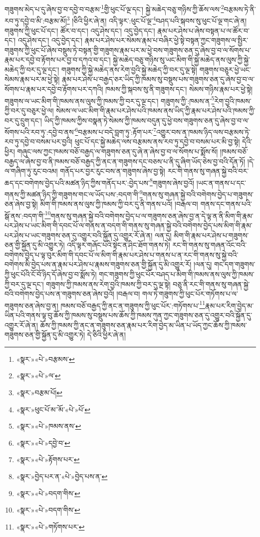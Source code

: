 གཟུགས་མེད་པ་དུ་ཞེས་བྱ་བ་དབྱེ་བ་བརྩམ་\footnote{«སྣར་»«པེ་»བརྩམས་}གྱི་ཕུང་པོ་ལྔ་དང་། སྐྱེ་མཆེད་བཅུ་གཉིས་ཀྱི་ཆོས་ལས་\footnote{«སྣར་»«པེ་»ལ་}བརྩམས་ཏེ་ནི་རབ་ཏུ་དབྱེ་བ་མི་:བརྩམ་མོ།\footnote{«སྣར་»བརྩམ་པོ།} །ཅིའི་ཕྱིར་ཞེ་ན། འདི་ལྟར་:ཕུང་པོ་ལྔ་\footnote{«སྣར་»ཕུང་པོ་མ་ོ་མ་«པེ་»པོ་}བཤད་པའི་སྐབས་སུ་ཕུང་པོ་ལྔ་གང་ཞེ་ན། གཟུགས་ཀྱི་ཕུང་པོ་དང་། ཚོར་བ་དང་། འདུ་ཤེས་དང་། འདུ་བྱེད་དང་། རྣམ་པར་ཤེས་པ་ཞེས་བསྟན་པ་ལ་ཚོར་བ་དང་། འདུ་ཤེས་དང་། འདུ་བྱེད་དང་། རྣམ་པར་ཤེས་པར་སེམས་རྣམ་པ་བཞིར་ཕྱེ་སྟེ་བསྟན་ཀྱང་གཟུགས་ལ་སྤྱིར་གཟུགས་ཀྱི་ཕུང་པོ་ཞེས་བསྡུས་ཏེ་བསྟན་གྱི་གཟུགས་རྣམ་པར་མ་ཕྱེ་བས་གཟུགས་ཅན་དུ་ཞེས་བྱ་བ་ལ་སོགས་པ་རྣམ་པར་དབྱེ་བ་རྟོགས་པར་བྱ་བ་དཀའ་བ་དང་། སྐྱེ་མཆེད་བཅུ་གཉིས་སུ་ཡང་མིག་གི་སྐྱེ་མཆེད་ནས་ལུས་ཀྱི་སྐྱེ་མཆེད་ཀྱི་བར་དུ་ལྔ་དང་། གཟུགས་ཀྱི་སྐྱེ་མཆེད་ནས་རེག་བྱའི་སྐྱེ་མཆེད་ཀྱི་བར་དུ་ལྔ་སྟེ། གཟུགས་བཅུར་ཕྱེ་ཡང་སེམས་རྣམ་པར་མ་ཕྱེ་སྟེ། རྣམ་པར་ཤེས་པ་བརྒྱད་ཅར་ཡིད་ཀྱི་ཁམས་སུ་བསྡུས་པས་གཟུགས་ཅན་དུ་ཞེས་བྱ་བ་ལ་སོགས་པ་རྣམ་པར་དབྱེ་བ་རྟོགས་པར་དཀའི། ཁམས་ཀྱི་སྐབས་སུ་ནི་གཟུགས་དང་། སེམས་གཉིས་རྣམ་པར་ཕྱེ་སྟེ། གཟུགས་ལ་ཡང་མིག་གི་ཁམས་ནས་ལུས་ཀྱི་ཁམས་ཀྱི་བར་དུ་ལྔ་དང་། གཟུགས་ཀྱི་:ཁམས་ན་\footnote{«སྣར་»«པེ་»ཁམས་ནས་}རེག་བྱའི་ཁམས་ཀྱི་བར་དུ་བཅུར་ཕྱེ་ལ། སེམས་ལ་ཡང་མིག་གི་རྣམ་པར་ཤེས་པའི་ཁམས་ནས་ཡིད་ཀྱི་རྣམ་པར་ཤེས་པའི་ཁམས་ཀྱི་བར་དུ་དྲུག་དང་། ཡིད་ཀྱི་ཁམས་ཀྱིས་བསྣན་ཏེ་སེམས་ཀྱི་ཁམས་བདུན་དུ་ཕྱེ་བས་གཟུགས་ཅན་དུ་ཞེས་བྱ་བ་ལ་སོགས་པའི་རབ་ཏུ་:དབྱེ་བ་ནས་\footnote{«སྣར་»«པེ་»དབྱེ་བ་}བརྩམས་པ་བདེ་བླག་ཏུ་:རྟོག་པར་\footnote{«སྣར་»«པེ་»རྟོགས་པར་}འགྱུར་བས་ན་ཁམས་ཉིད་ལས་བརྩམས་ཏེ་རབ་ཏུ་དབྱེ་བ་བསམ་པར་བྱའི། ཕུང་པོ་དང་སྐྱེ་མཆེད་ལས་བརྩམས་ནས་རབ་ཏུ་དབྱེ་བ་བསམ་པར་མི་བྱ་སྟེ། དེའི་ཕྱིར། གཞུང་ལས་ཀྱང་ཁམས་བཅོ་བརྒྱད་ལ་གཟུགས་ཅན་དུ་ཞེ་ན་ཞེས་བྱ་བ་ལ་སོགས་པ་སྨོས་སོ། །ཁམས་བཅོ་བརྒྱད་ལ་ཞེས་བྱ་བ་ནི་ཁམས་བཅོ་བརྒྱད་ཀྱི་ནང་ན་གཟུགས་དང་བཅས་པ་ནི་དུ་ཞིག་ཡོད་ཅེས་བྱ་བའི་དོན་ཏོ། །དེ་ལ་གཞིག་ཏུ་རུང་བའམ། གནོད་པར་བྱར་རུང་བས་ན་གཟུགས་ཞེས་བྱ་སྟེ། རང་གི་གནས་སུ་གཞན་སྐྱེ་བའི་བར་ཆད་དང་བགེགས་བྱེད་པའི་མཚན་ཉིད་ཀྱིས་གནོད་པར་:བྱེད་པས་\footnote{«སྣར་»བྱེད་པར་ན་«པེ་»བྱེད་པས་ན་}གཟུགས་ཞེས་བྱའོ། །ཡང་ན་གནས་པ་དང་གནས་ཀྱི་མཚན་ཉིད་ཀྱི་གཟུགས་གང་ལ་ཡོད་པས་:བདག་གི་\footnote{«སྣར་»«པེ་»བདག་གིས་}གནས་སུ་གཞན་སྐྱེ་བའི་བགེགས་བྱེད་པ་གཟུགས་ཅན་ཞེས་བྱ་སྟེ། མིག་གི་ཁམས་ནས་ལུས་ཀྱི་ཁམས་ཀྱི་བར་དུ་ནི་གནས་པའོ། །བརྒལ་བ། གནས་དང་གནས་པའི་སྒོ་ནས་:བདག་གི་\footnote{«སྣར་»«པེ་»བདག་གིས་}གནས་སུ་གཞན་སྐྱེ་བའི་བགེགས་བྱེད་པ་ལ་གཟུགས་ཅན་ཞེས་བྱ་ན་དེ་ལྟ་ན་ནི་མིག་གི་རྣམ་པར་ཤེས་པ་ཡང་མིག་གི་དབང་པོ་ལ་གནས་ན་བདག་གི་གནས་སུ་གཞན་སྐྱེ་བའི་བགེགས་བྱེད་པས་མིག་གི་རྣམ་པར་ཤེས་པ་ཡང་གཟུགས་ཅན་དུ་འགྱུར་བའི་སྐྱོན་དུ་འགྱུར་རོ་ཞེ་ན། ལན་དུ། མིག་གི་རྣམ་པར་ཤེས་པ་གཟུགས་ཅན་གྱི་སྐྱོན་དུ་མི་འགྱུར་ཏེ། འདི་ལྟར་གཞོང་པའི་སྟེང་ན་ཤིང་ཐོག་གནས་ཏེ། རང་གི་གནས་སུ་གཞན་འོང་བའི་བགེགས་བྱེད་པ་ལྟ་བུར་མིག་གི་དབང་པོ་ལ་མིག་གི་རྣམ་པར་ཤེས་པ་གནས་པ་ན་རང་གི་གནས་སུ་སྐྱེ་བའི་བགེགས་མི་བྱེད་པས་ན་རྣམ་པར་ཤེས་པ་རྣམས་གཟུགས་ཅན་གྱི་སྐྱོན་དུ་མི་འགྱུར་རོ། །ལན་དུ། གང་དག་གཟུགས་ཀྱི་ཕུང་པོའི་ངོ་བོ་ཉིད་དོ་ཞེས་བྱ་བ་སྨོས་ཏེ། གང་གཟུགས་ཀྱི་ཕུང་པོར་བཤད་པ་མིག་གི་ཁམས་ནས་ལུས་ཀྱི་ཁམས་ཀྱི་བར་དུ་ལྔ་དང་། གཟུགས་ཀྱི་ཁམས་ནས་རེག་བྱའི་ཁམས་ཀྱི་བར་དུ་ལྔ་སྟེ། བཅུ་ནི་རང་གི་གནས་སུ་གཞན་སྐྱེ་བའི་བགེགས་བྱེད་པས་ན་གཟུགས་ཅན་ཞེས་བྱའོ། །བརྒལ་བ། གལ་ཏེ་གཟུགས་ཀྱི་ཕུང་པོར་གཏོགས་པ་ལ་གཟུགས་ཅན་ཞེས་བྱ་ན། ཁམས་བཅོ་བརྒྱད་ཀྱི་ནང་ན་གཟུགས་ཀྱི་ཕུང་པོར་:གཏོགས་པ་\footnote{«སྣར་»«པེ་»གཏོགས་པར་}རྣམ་པར་རིག་བྱེད་མ་ཡིན་པའི་གནས་ལྟ་བུ་ཆོས་ཀྱི་ཁམས་སུ་བསྡུས་པས་ཆོས་ཀྱི་ཁམས་ཀུན་ཀྱང་གཟུགས་ཅན་དུ་འགྱུར་བའི་སྐྱོན་དུ་འགྱུར་རོ་ཞེ་ན། ཆོས་ཀྱི་ཁམས་ཀྱི་ནང་ན་གཟུགས་ཅན་རྣམ་པར་རིག་བྱེད་མ་ཡིན་པ་ཡོད་ཀྱང་ཆོས་ཀྱི་ཁམས་གཟུགས་ཅན་གྱི་སྐྱོན་དུ་མི་འགྱུར་ཏེ། དེ་ཅིའི་ཕྱིར་ཞེ་ན། 